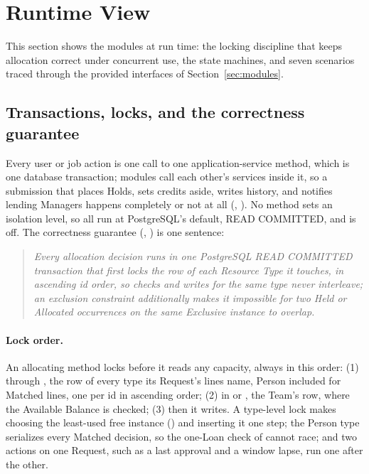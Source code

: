 \begingroup\setlength{\emergencystretch}{2em}
\section{Runtime View}\label{sec:runtime}

This section shows the modules at run time: the locking discipline that keeps allocation correct under concurrent use, the state machines, and seven scenarios traced through the provided interfaces of Section~\ref{sec:modules}.

\subsection{Transactions, locks, and the correctness guarantee}

Every user or job action is one call to one  application-service method, which is one database transaction; modules call each other's services inside it, so a submission that places Holds, sets credits aside, writes history, and notifies lending Managers happens completely or not at all (, ). No method sets an isolation level, so all run at PostgreSQL's default, READ COMMITTED, and  is off. The correctness guarantee (, ) is one sentence:

\begin{quote}\itshape
Every allocation decision runs in one PostgreSQL READ COMMITTED transaction that first locks the row of each Resource Type it touches, in ascending id order, so checks and writes for the same type never interleave; an exclusion constraint additionally makes it impossible for two Held or Allocated occurrences on the same Exclusive instance to overlap.
\end{quote}

\paragraph{Lock order.} An allocating method locks before it reads any capacity, always in this order: (1) through , the  row of every type its Request's lines name, Person included for Matched lines, one  per id in ascending order; (2) in  or , the Team's  row, where the Available Balance is checked; (3) then it writes. A type-level lock makes choosing the least-used free instance () and inserting it one step; the Person type serializes every Matched decision, so the one-Loan check of  cannot race; and two actions on one Request, such as a last approval and a window lapse, run one after the other.

